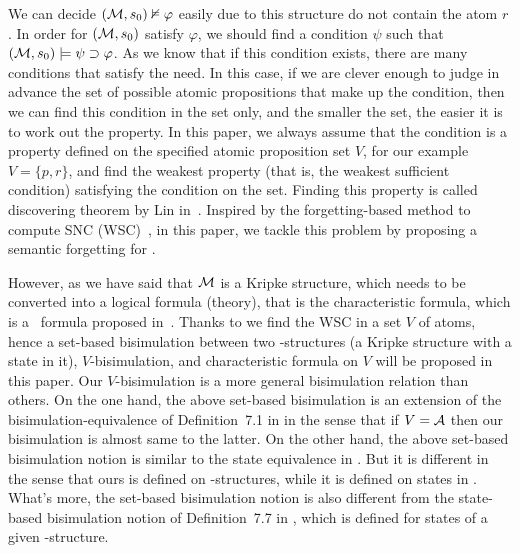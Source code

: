 \documentclass{article}
\begin{document}
We can decide $({\cal M}, s_0)\nvDash \varphi$ easily due to this structure do not contain the atom $r$.
In order for $({\cal M}, s_0)$ satisfy $\varphi$, we should find a condition $\psi$ such that $({\cal M}, s_0) \models \psi \supset \varphi$.
 As we know that if this condition exists, there are many conditions that satisfy the need.
In this case, if we are clever enough to judge in advance the set of possible atomic propositions that make up the condition, then we can find this condition in the set only, and the smaller the set, the easier it is to work out the property.
In this paper, we always assume that the condition is a property defined on the specified atomic proposition set $V$, for our example $V=\{p,r\}$, and find the weakest property (that is, the weakest sufficient condition) satisfying the condition on the set. Finding this property is called discovering theorem by Lin in~\cite{DBLP:journals/aim/Lin18}.
Inspired by the forgetting-based method to compute SNC (WSC)~\cite{DBLP:journals/ai/Lin01}, in this paper, we tackle this problem by proposing a semantic forgetting for \CTL.

However, as we have said that ${\cal M}$ is a Kripke structure, which needs to be converted into a logical formula (theory), that is the characteristic formula, which is a \CTL\ formula proposed in~\cite{DBLP:journals/tcs/BrowneCG88}.
Thanks to we find the WSC in a set $V$ of atoms, hence a set-based bisimulation between two \MPK-structures (a Kripke structure with a state in it), $V$-bisimulation, and characteristic formula on $V$ will be proposed in this paper.
Our $V$-bisimulation is a more general bisimulation relation than others.
On the one hand, the above set-based bisimulation is an extension of the
bisimulation-equivalence of Definition~7.1 in \cite{Baier:PMC:2008} in the
sense that if $V=\cal A$ then our bisimulation is almost same to the
latter.
On the other hand, the above set-based bisimulation notion is similar to
the state equivalence in \cite{DBLP:journals/tcs/BrowneCG88}. But it is
different in the sense that ours is defined on \MPK-structures,
while it is defined on states in \cite{DBLP:journals/tcs/BrowneCG88}.
What's more, the set-based bisimulation notion is also different
from  the state-based bisimulation notion of Definition~7.7 in \cite{Baier:PMC:2008},
which is defined for states of a given \MPK-structure.
\end{document}
